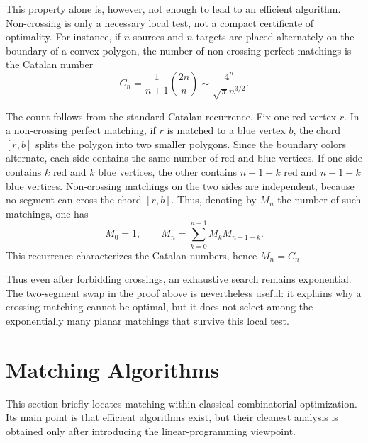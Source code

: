 This property alone is, however, not enough to lead to an efficient algorithm. Non-crossing is only a necessary local test, not a compact certificate of optimality. For instance, if $n$ sources and $n$ targets are placed alternately on the boundary of a convex polygon, the number of non-crossing perfect matchings is the Catalan number
\[
	C_n=\frac{1}{n+1}\binom{2n}{n}\sim \frac{4^n}{\sqrt{\pi}n^{3/2}}.
\]

\begin{rem}
	The count follows from the standard Catalan recurrence. Fix one red vertex $r$. In a non-crossing perfect matching, if $r$ is matched to a blue vertex $b$, the chord $[r,b]$ splits the polygon into two smaller polygons. Since the boundary colors alternate, each side contains the same number of red and blue vertices. If one side contains $k$ red and $k$ blue vertices, the other contains $n-1-k$ red and $n-1-k$ blue vertices. Non-crossing matchings on the two sides are independent, because no segment can cross the chord $[r,b]$. Thus, denoting by $M_n$ the number of such matchings, one has
	\[
		M_0=1,
		\qquad
		M_n=\sum_{k=0}^{n-1} M_k M_{n-1-k}.
	\]
	This recurrence characterizes the Catalan numbers, hence $M_n=C_n$.
\end{rem}

Thus even after forbidding crossings, an exhaustive search remains exponential. The two-segment swap in the proof above is nevertheless useful: it explains why a crossing matching cannot be optimal, but it does not select among the exponentially many planar matchings that survive this local test.


\section{Matching Algorithms}

This section briefly locates matching within classical combinatorial optimization. Its main point is that efficient algorithms exist, but their cleanest analysis is obtained only after introducing the linear-programming viewpoint.

